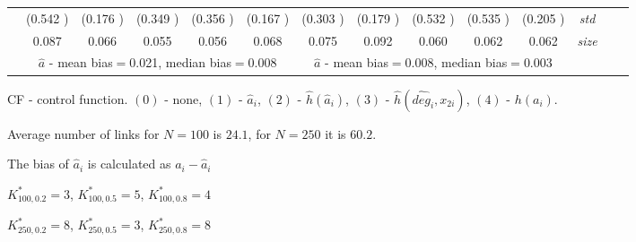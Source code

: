 \begin{table}
\begin{threeparttable}
{\begin{tabular}{|c|c|c|c|c|c|c|c|c|c|c|c|c|c|}
&(0.542 )&(0.176 )&(0.349 )&(0.356 )&(0.167 )&(0.303 )&(0.179 )&(0.532 )&(0.535 )&(0.205 )&\textit{std}\\ 
& 0.087 & 0.066 &0.055 &0.056 &0.068 &0.075& 0.092& 0.060 &0.062 &0.062 &\textit{size} \\\midrule 
&\multicolumn{5}{|c|}{$\hat{a}$ - mean bias$=$0.021, median bias$=$0.008 }&\multicolumn{5}{|c|}{$\hat{a}$ - mean bias$=$0.008, median bias$=$0.003 }&\\ \hline 
\end{tabular}} 
\begin{tablenotes}\tiny 
\item CF - control function. $(0)$ - none, $(1)$ - $\hat{a}_i$,  $(2)$ - $\hat{h}(\hat{a}_i)$, $(3)$ - $\hat{h}(\widehat{deg}_i,x_{2i})$, $(4)$ - $h(a_i)$. 
\item Average number of links for $N=100$ is $24.1$, for $N=250$ it is $60.2$. 
\item The bias of $\hat{a}_i$ is calculated as $a_i-\hat{a}_i$ 
\item $K^*_{100,0.2}=3$, $K^*_{100,0.5}=5$, $K^*_{100,0.8}=4$ 
\item $K^*_{250,0.2}=8$, $K^*_{250,0.5}=3$, $K^*_{250,0.8}=8$ 
  \end{tablenotes} 
\end{threeparttable} 
\end{table} 
